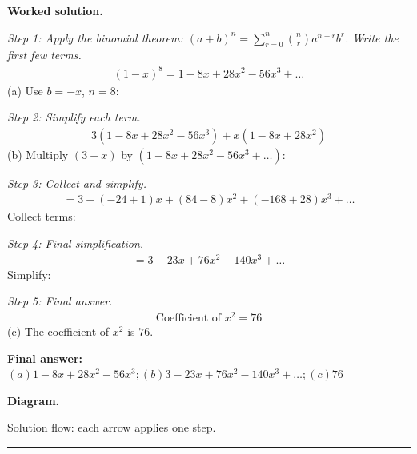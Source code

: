 \documentclass[11pt]{article}
\begin{document}
\textbf{Worked solution.}

\textit{Step 1: Apply the binomial theorem: \((a+b)^n = \sum_{r=0}^{n} \binom{n}{r} a^{n-r} b^r\). Write the first few terms.}
\[\begin{gathered}
(1-x)^8 = 1 - 8x + 28x^2 - 56x^3 + \ldots
\end{gathered}\]
(a) Use \(b = -x\), \(n = 8\):

\textit{Step 2: Simplify each term.}
\[\begin{gathered}
3(1 - 8x + 28x^2 - 56x^3) + x(1 - 8x + 28x^2)
\end{gathered}\]
(b) Multiply \((3 + x)\) by \((1 - 8x + 28x^2 - 56x^3 + \ldots)\):

\textit{Step 3: Collect and simplify.}
\[\begin{gathered}
= 3 + (-24 + 1)x + (84 - 8)x^2 + (-168 + 28)x^3 + \ldots
\end{gathered}\]
Collect terms:

\textit{Step 4: Final simplification.}
\[\begin{gathered}
= 3 - 23x + 76x^2 - 140x^3 + \ldots
\end{gathered}\]
Simplify:

\textit{Step 5: Final answer.}
\[\begin{gathered}
\text{Coefficient of } x^2 = 76
\end{gathered}\]
(c) The coefficient of \(x^2\) is \(76\).

\begin{answerbox}
\textbf{Final answer:}\quad \(\displaystyle (a) 1 - 8x + 28x^2 - 56x^3; (b) 3 - 23x + 76x^2 - 140x^3 + \ldots; (c) 76\)
\end{answerbox}
\textbf{Diagram.}

\begin{center}
\end{center}
\small Solution flow: each arrow applies one step.\normalsize

\medskip\hrule
\end{document}
